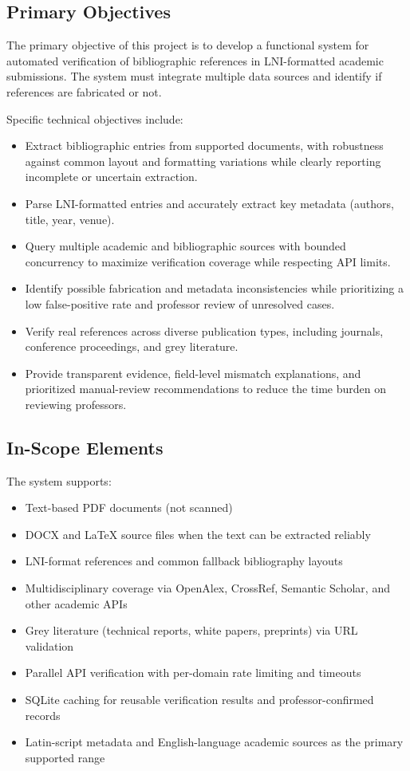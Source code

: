 \documentclass[12pt,a4paper,oneside]{report}
\begin{document}
\subsection{Primary Objectives}

The primary objective of this project is to develop a functional system for automated verification of bibliographic references in LNI-formatted academic submissions. The system must integrate multiple data sources and identify if references are fabricated or not.

Specific technical objectives include:
\begin{itemize}
    \item Extract bibliographic entries from supported documents, with robustness against common layout and formatting variations while clearly reporting incomplete or uncertain extraction.
    \item Parse LNI-formatted entries and accurately extract key metadata (authors, title, year, venue).
    \item Query multiple academic and bibliographic sources with bounded concurrency to maximize verification coverage while respecting API limits.
    \item Identify possible fabrication and metadata inconsistencies while prioritizing a low false-positive rate and professor review of unresolved cases.
    \item Verify real references across diverse publication types, including journals, conference proceedings, and grey literature.
    \item Provide transparent evidence, field-level mismatch explanations, and prioritized manual-review recommendations to reduce the time burden on reviewing professors.
\end{itemize}

\subsection{In-Scope Elements}

The system supports:
\begin{itemize}
    \item Text-based PDF documents (not scanned)
    \item DOCX and LaTeX source files when the text can be extracted reliably
    \item LNI-format references and common fallback bibliography layouts
    \item Multidisciplinary coverage via OpenAlex, CrossRef, Semantic Scholar, and other academic APIs
    \item Grey literature (technical reports, white papers, preprints) via URL validation
    \item Parallel API verification with per-domain rate limiting and timeouts
    \item SQLite caching for reusable verification results and professor-confirmed records
    \item Latin-script metadata and English-language academic sources as the primary supported range
\end{itemize}
\end{document}
